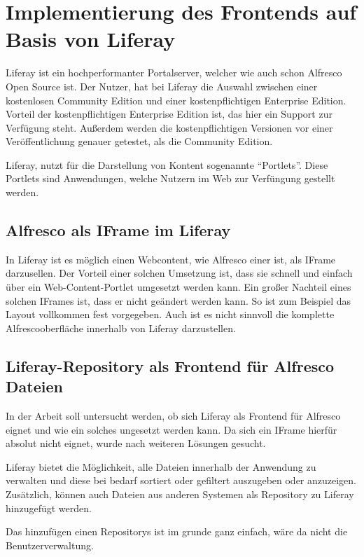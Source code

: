 \section{Implementierung des Frontends auf Basis von Liferay} \label{Implementierung Frontend}
Liferay ist ein hochperformanter Portalserver, welcher wie auch schon Alfresco Open Source ist. Der Nutzer, hat bei Liferay die Auswahl zwischen einer kostenlosen Community Edition und einer kostenpflichtigen Enterprise Edition. Vorteil der kostenpflichtigen Enterprise Edition ist, das hier ein Support zur Verf\"ugung steht. Au\ss{}erdem werden die kostenpflichtigen Versionen vor einer Ver\"offentlichung genauer getestet, als die Community Edition.
\cite{Alfresco_und_Liferay} \cite{Wiki_Liferay}

Liferay, nutzt f\"ur die Darstellung von Kontent sogenannte "`Portlets"'. Diese Portlets sind Anwendungen, welche Nutzern im Web zur Verf\"ungung gestellt werden.

\subsection{Alfresco als IFrame im Liferay}
In Liferay ist es m\"oglich einen Webcontent, wie Alfresco einer ist, als IFrame darzusellen. Der Vorteil einer solchen Umsetzung ist, dass sie schnell und einfach \"uber ein Web-Content-Portlet umgesetzt werden kann. Ein gro\ss{}er Nachteil eines solchen IFrames ist, dass er nicht ge\"andert werden kann. So ist zum Beispiel das Layout vollkommen fest vorgegeben. Auch ist es nicht sinnvoll die komplette Alfrescooberfl\"ache innerhalb von Liferay darzustellen.

\subsection{Liferay-Repository als Frontend f\"ur Alfresco Dateien}
In der Arbeit soll untersucht werden, ob sich Liferay als Frontend f\"ur Alfresco eignet und wie ein solches ungesetzt werden kann. Da sich ein IFrame hierf\"ur absolut nicht eignet, wurde nach weiteren L\"osungen gesucht.

Liferay bietet die M\"oglichkeit, alle Dateien innerhalb der Anwendung zu verwalten und diese bei bedarf sortiert oder gefiltert auszugeben oder anzuzeigen. Zus\"atzlich, k\"onnen auch Dateien aus anderen Systemen als Repository zu Liferay hinzugef\"ugt werden. 

Das hinzuf\"ugen einen Repositorys ist im grunde ganz einfach, w\"are da nicht die Benutzerverwaltung. 


